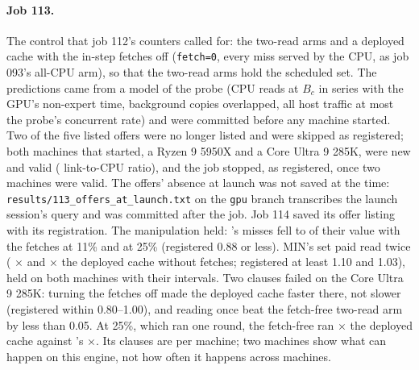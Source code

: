 \paragraph{Job 113.} The control that job 112's counters called for: the two-read arms and a deployed cache with the
in-step fetches off (\texttt{fetch=0}, every miss served by the CPU, as job 093's all-CPU arm), so that the two-read arms
hold the scheduled set. The predictions came from a model of the probe (CPU reads at $B_c$ in series with the GPU's
non-expert time, background copies overlapped, all host traffic at most the probe's concurrent rate) and were committed
before any machine started. Two of the five listed offers were no longer listed and were skipped as registered; both
machines that started, a Ryzen 9 5950X and a Core Ultra 9 285K, were new and valid (\hsRatioRng{} link-to-CPU ratio),
and the job stopped, as registered, once two machines were valid. The offers' absence at launch was not saved at the
time: \texttt{results/113\_offers\_at\_launch.txt} on the \texttt{gpu} branch transcribes the launch session's query and
was committed after the job. Job 114 saved its offer listing with its registration. The manipulation held: \FewTwo's misses fell to \hsMissRatioLowRng{} of their
value with the fetches at 11\% and \hsMissRatioMidRng{} at 25\% (registered 0.88 or less). MIN's set paid read twice
(\FewTwo{} \hsPlanZeroLowRng$\times$ and \MinTwo{} \hsGreedyZeroLowRng$\times$ the deployed cache without fetches; registered
at least 1.10 and 1.03), held on both machines with their intervals. Two clauses failed on the Core Ultra 9 285K: turning
the fetches off made the deployed cache faster there, not slower (registered within 0.80--1.00), and reading once beat the
fetch-free two-read arm by less than 0.05. At 25\%, which ran one round, the fetch-free \FewTwo{} ran
\hsPlanZeroVsBaseMidRng$\times$ the deployed cache against \FewOne's \hsFewOneMidRng$\times$. Its clauses are per machine; two
machines show what can happen on this engine, not how often it happens across machines.

